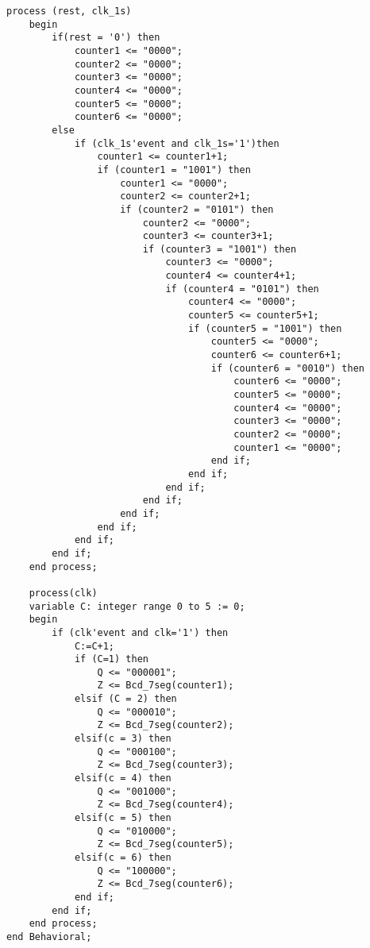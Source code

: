 \documentclass[12pt]{exam}
\begin{document}
\begin{questions}
\begin{latin}
\begin{lstlisting}[style=vhdl,caption={Example VHDL code}]
	process (rest, clk_1s)
	begin
		if(rest = '0') then
			counter1 <= "0000";
			counter2 <= "0000";
			counter3 <= "0000";
			counter4 <= "0000";
			counter5 <= "0000";
			counter6 <= "0000";
		else
			if (clk_1s'event and clk_1s='1')then
				counter1 <= counter1+1;
				if (counter1 = "1001") then
					counter1 <= "0000";
					counter2 <= counter2+1;
					if (counter2 = "0101") then
						counter2 <= "0000";
						counter3 <= counter3+1;
						if (counter3 = "1001") then
							counter3 <= "0000";
							counter4 <= counter4+1;
							if (counter4 = "0101") then
								counter4 <= "0000";
								counter5 <= counter5+1;
								if (counter5 = "1001") then
									counter5 <= "0000";
									counter6 <= counter6+1;
									if (counter6 = "0010") then
										counter6 <= "0000";
										counter5 <= "0000";
										counter4 <= "0000";
										counter3 <= "0000";
										counter2 <= "0000";
										counter1 <= "0000";				 	
									end if;	
								end if;
							end if;
						end if;
					end if; 
				end if;
			end if;
		end if;
	end process;

	process(clk)
	variable C: integer range 0 to 5 := 0;
	begin
		if (clk'event and clk='1') then
			C:=C+1;
			if (C=1) then 
				Q <= "000001";
				Z <= Bcd_7seg(counter1);
			elsif (C = 2) then
				Q <= "000010";
				Z <= Bcd_7seg(counter2);
			elsif(c = 3) then
				Q <= "000100";
				Z <= Bcd_7seg(counter3);
			elsif(c = 4) then
				Q <= "001000";
				Z <= Bcd_7seg(counter4);
			elsif(c = 5) then
				Q <= "010000";
				Z <= Bcd_7seg(counter5);
			elsif(c = 6) then
				Q <= "100000";
				Z <= Bcd_7seg(counter6);				
			end if;
		end if;
	end process;
end Behavioral;
\end{lstlisting}
\end{latin}

\end{questions}
\end{document}
